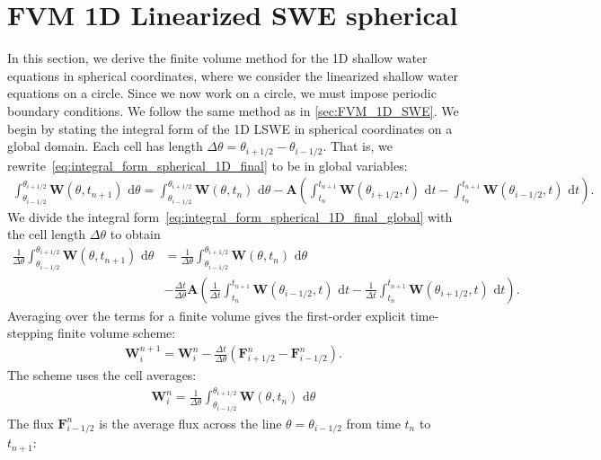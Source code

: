 \section{FVM 1D Linearized SWE spherical}
In this section, we derive the finite volume method for the 1D shallow water equations in spherical coordinates, where we consider the linearized shallow water equations on a circle.
Since we now work on a circle, we must impose periodic boundary conditions.
We follow the same method as in \autoref{sec:FVM_1D_SWE}.
We begin by stating the integral form of the 1D LSWE in spherical coordinates on a global domain.
Each cell has length $\Delta \theta = \theta_{i+1/2} - \theta_{i-1/2}$.
That is, we rewrite~\eqref{eq:integral_form_spherical_1D_final} to be in global variables:
\begin{align}\label{eq:integral_form_spherical_1D_final_global}
    \int_{\theta_{i-1/2}}^{\theta_{i+1/2}} \mathbf{W}(\theta, t_{n+1}) \text{ d}\theta = \int_{\theta_{i-1/2}}^{\theta_{i+1/2}} \mathbf{W}(\theta, t_n) \text{ d}\theta
    - \mathbf{A} \left( \int_{t_n}^{t_{n+1}} \mathbf{W}(\theta_{i+1/2}, t) \text{ d}t - \int_{t_n}^{t_{n+1}} \mathbf{W}(\theta_{i-1/2}, t) \text{ d}t \right).
\end{align}
We divide the integral form~\eqref{eq:integral_form_spherical_1D_final_global} with the cell length $\Delta \theta$ to obtain
\begin{align*}
    \frac{1}{\Delta \theta} \int_{\theta_{i-1/2}}^{\theta_{i+1/2}} \mathbf{W}(\theta, t_{n+1}) \text{ d}\theta &=
    \frac{1}{\Delta \theta} \int_{\theta_{i-1/2}}^{\theta_{i+1/2}} \mathbf{W}(\theta, t_n) \text{ d}\theta \\
    &- \frac{\Delta t}{\Delta \theta} \mathbf{A} \left( \frac{1}{\Delta t} \int_{t_n}^{t_{n+1}} \mathbf{W}(\theta_{i-1/2}, t) \text{ d}t - \frac{1}{\Delta t} \int_{t_n}^{t_{n+1}} \mathbf{W}(\theta_{i+1/2}, t) \text{ d}t\right) .
\end{align*}
Averaging over the terms for a finite volume gives the first-order explicit time-stepping finite volume scheme:
\begin{align}
    \mathbf{W}_i^{n+1} = \mathbf{W}_i^n - \frac{\Delta t}{\Delta \theta} (\mathbf{F}_{i+1/2}^n - \mathbf{F}_{i-1/2}^n).
\end{align}
The scheme uses the cell averages:
\begin{align*}
    \mathbf{W}_i^{n} = \frac{1}{\Delta \theta} \int_{\theta_{i-1/2}}^{\theta_{i+1/2}} \mathbf{W}(\theta, t_n) \text{ d}\theta
\end{align*}
The flux $\mathbf{F}_{i-1/2}^n$ is the average flux across the line $\theta = \theta_{i-1/2}$ from time $t_n$ to $t_{n+1}$:
